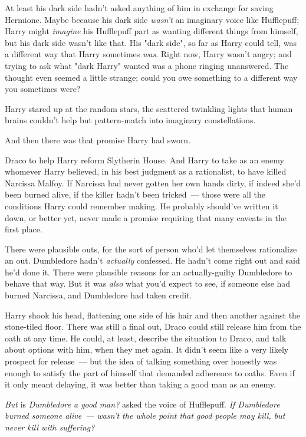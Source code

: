 At least his dark side hadn't asked anything of him in exchange for saving
Hermione. Maybe because his dark side \emph{wasn't} an imaginary voice like
Hufflepuff; Harry might \emph{imagine} his Hufflepuff part as wanting different
things from himself, but his dark side wasn't like that. His "dark side", so
far as Harry could tell, was a different way that Harry sometimes \emph{was}.
Right now, Harry wasn't angry; and trying to ask what "dark Harry" wanted was a
phone ringing unanswered. The thought even seemed a little strange; could you
owe something to a different way you sometimes were?

Harry stared up at the random stars, the scattered twinkling lights that human
brains couldn't help but pattern-match into imaginary constellations.

And then there was that promise Harry had sworn.

Draco to help Harry reform Slytherin House. And Harry to take as an enemy
whomever Harry believed, in his best judgment as a rationalist, to have killed
Narcissa Malfoy. If Narcissa had never gotten her own hands dirty, if indeed
she'd been burned alive, if the killer hadn't been tricked~--- those were all the
conditions Harry could remember making. He probably should've written it down,
or better yet, never made a promise requiring that many caveats in the first
place.

There were plausible outs, for the sort of person who'd let themselves
rationalize an out. Dumbledore hadn't \emph{actually} confessed. He hadn't come
right out and said he'd done it. There were plausible reasons for an
actually-guilty Dumbledore to behave that way. But it was \emph{also} what
you'd expect to see, if someone else had burned Narcissa, and Dumbledore had
taken credit.

Harry shook his head, flattening one side of his hair and then another against
the stone-tiled floor. There was still a final out, Draco could still release
him from the oath at any time. He could, at least, describe the situation to
Draco, and talk about options with him, when they met again. It didn't seem
like a very likely prospect for release~--- but the idea of talking something
over honestly was enough to satisfy the part of himself that demanded adherence
to oaths. Even if it only meant delaying, it was better than taking a good man
as an enemy.

\emph{But} is \emph{Dumbledore a good man?} asked the voice of Hufflepuff.
\emph{If Dumbledore burned someone alive~--- wasn't the whole point that good
people may kill, but never kill with suffering?}

